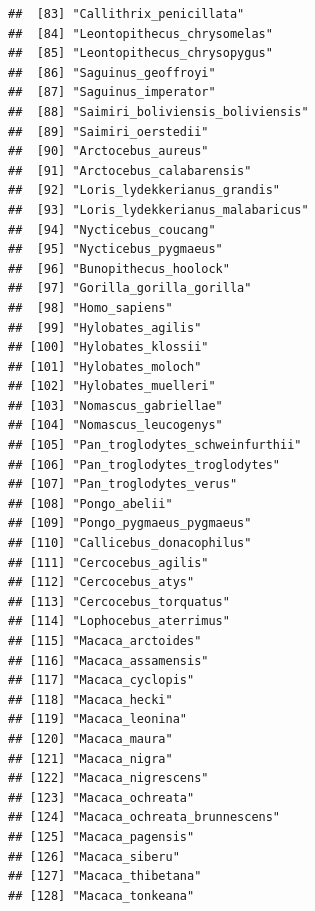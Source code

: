 \documentclass[]{article}
\begin{document}
\begin{verbatim}
##  [83] "Callithrix_penicillata"                       
##  [84] "Leontopithecus_chrysomelas"                   
##  [85] "Leontopithecus_chrysopygus"                   
##  [86] "Saguinus_geoffroyi"                           
##  [87] "Saguinus_imperator"                           
##  [88] "Saimiri_boliviensis_boliviensis"              
##  [89] "Saimiri_oerstedii"                            
##  [90] "Arctocebus_aureus"                            
##  [91] "Arctocebus_calabarensis"                      
##  [92] "Loris_lydekkerianus_grandis"                  
##  [93] "Loris_lydekkerianus_malabaricus"              
##  [94] "Nycticebus_coucang"                           
##  [95] "Nycticebus_pygmaeus"                          
##  [96] "Bunopithecus_hoolock"                         
##  [97] "Gorilla_gorilla_gorilla"                      
##  [98] "Homo_sapiens"                                 
##  [99] "Hylobates_agilis"                             
## [100] "Hylobates_klossii"                            
## [101] "Hylobates_moloch"                             
## [102] "Hylobates_muelleri"                           
## [103] "Nomascus_gabriellae"                          
## [104] "Nomascus_leucogenys"                          
## [105] "Pan_troglodytes_schweinfurthii"               
## [106] "Pan_troglodytes_troglodytes"                  
## [107] "Pan_troglodytes_verus"                        
## [108] "Pongo_abelii"                                 
## [109] "Pongo_pygmaeus_pygmaeus"                      
## [110] "Callicebus_donacophilus"                      
## [111] "Cercocebus_agilis"                            
## [112] "Cercocebus_atys"                              
## [113] "Cercocebus_torquatus"                         
## [114] "Lophocebus_aterrimus"                         
## [115] "Macaca_arctoides"                             
## [116] "Macaca_assamensis"                            
## [117] "Macaca_cyclopis"                              
## [118] "Macaca_hecki"                                 
## [119] "Macaca_leonina"                               
## [120] "Macaca_maura"                                 
## [121] "Macaca_nigra"                                 
## [122] "Macaca_nigrescens"                            
## [123] "Macaca_ochreata"                              
## [124] "Macaca_ochreata_brunnescens"                  
## [125] "Macaca_pagensis"                              
## [126] "Macaca_siberu"                                
## [127] "Macaca_thibetana"                             
## [128] "Macaca_tonkeana"                              

\end{verbatim}
\end{document}
